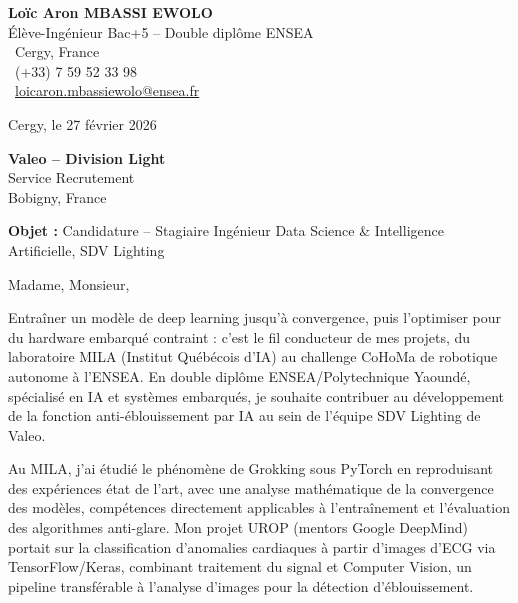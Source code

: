 \documentclass[a4paper,11pt]{article}
\begin{document}
\noindent
\begin{minipage}[t]{0.5\textwidth}
    \textbf{Loïc Aron MBASSI EWOLO}\\
    Élève-Ingénieur Bac+5 -- Double diplôme ENSEA\\[3pt]
    \faMapMarker\ Cergy, France\\
    \faPhone\ (+33) 7 59 52 33 98\\
    \faEnvelope\ \href{mailto:loicaron.mbassiewolo@ensea.fr}{loicaron.mbassiewolo@ensea.fr}
\end{minipage}
\hfill
\begin{minipage}[t]{0.4\textwidth}
    \raggedleft
    Cergy, le 27 février 2026
\end{minipage}

\vspace{1.2cm}

\hfill
\begin{minipage}[t]{0.5\textwidth}
    \raggedleft
    \textbf{Valeo -- Division Light}\\
    Service Recrutement\\
    Bobigny, France
\end{minipage}

\vspace{1cm}

\noindent\textbf{Objet :} Candidature -- Stagiaire Ingénieur Data Science \& Intelligence Artificielle, SDV Lighting

\vspace{0.8cm}

Madame, Monsieur,

Entraîner un modèle de deep learning jusqu'à convergence, puis l'optimiser pour du hardware embarqué contraint : c'est le fil conducteur de mes projets, du laboratoire MILA (Institut Québécois d'IA) au challenge CoHoMa de robotique autonome à l'ENSEA. En double diplôme ENSEA/Polytechnique Yaoundé, spécialisé en IA et systèmes embarqués, je souhaite contribuer au développement de la fonction anti-éblouissement par IA au sein de l'équipe SDV Lighting de Valeo.

Au MILA, j'ai étudié le phénomène de Grokking sous PyTorch en reproduisant des expériences état de l'art, avec une analyse mathématique de la convergence des modèles, compétences directement applicables à l'entraînement et l'évaluation des algorithmes anti-glare. Mon projet UROP (mentors Google DeepMind) portait sur la classification d'anomalies cardiaques à partir d'images d'ECG via TensorFlow/Keras, combinant traitement du signal et Computer Vision, un pipeline transférable à l'analyse d'images pour la détection d'éblouissement.
\end{document}
